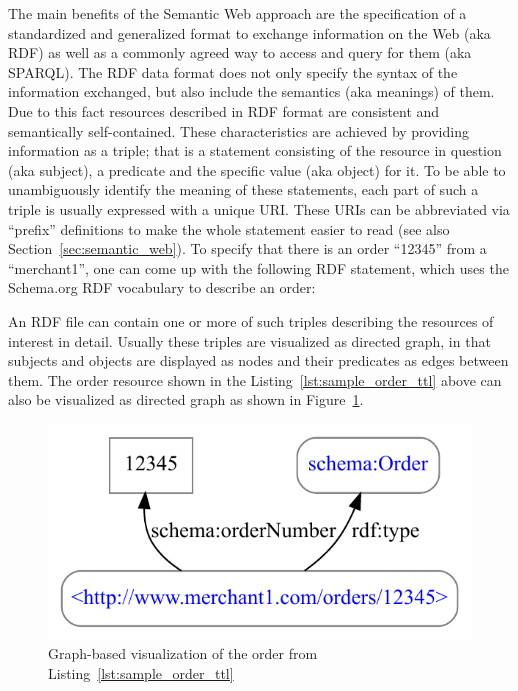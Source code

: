 The main benefits of the Semantic Web approach are the specification of a standardized and generalized format to exchange information on the Web (aka \gls{RDF}) as well as a commonly agreed way to access and query for them (aka \gls{SPARQL}). The \gls{RDF} data format does not only specify the syntax of the information exchanged, but also include the semantics (aka meanings) of them. Due to this fact resources described in \gls{RDF} format are consistent and semantically self-contained. These characteristics are achieved by providing information as a triple; that is a statement consisting of the resource in question (aka subject), a predicate and the specific value (aka object) for it. To be able to unambiguously identify the meaning of these statements, each part of such a triple is usually expressed with a unique \gls{URI}. These \gls{URI}s can be abbreviated via ``prefix'' definitions to make the whole statement easier to read (see also Section~\ref{sec:semantic_web}). To specify that there is an order ``12345'' from a ``merchant1'', one can come up with the following \gls{RDF} statement, which uses the Schema.org \gls{RDF} vocabulary \citep{Schema.org} to describe an order: \@


An \gls{RDF} file can contain one or more of such triples describing the resources of interest in detail. Usually these triples are visualized as directed graph, in that subjects and objects are displayed as nodes and their predicates as edges between them. The order resource shown in the Listing~\ref{lst:sample_order_ttl} above can also be visualized as directed graph as shown in Figure~\ref{fig:sample_order_graph_image}. \@

\begin{figure}[H]
  \centering
  \includegraphics[width=0.6\columnwidth]{images/sample_order_12345.pdf}
  \caption{Graph-based visualization of the order from Listing~\ref{lst:sample_order_ttl}}
\label{fig:sample_order_graph_image}
\end{figure}

